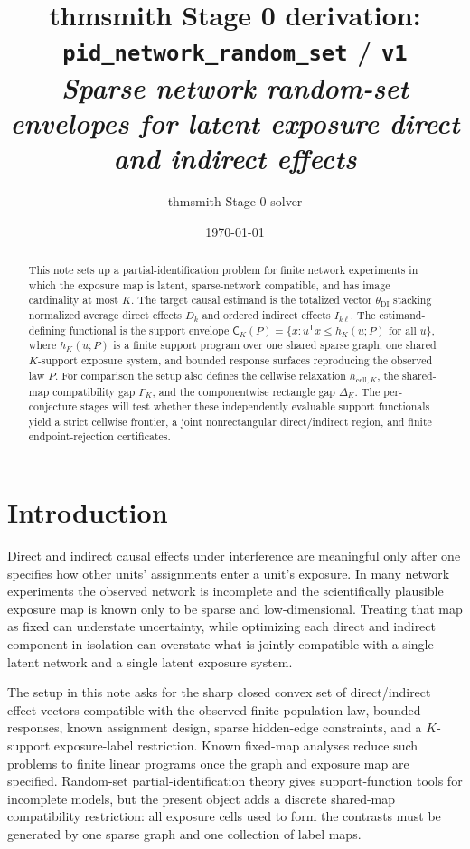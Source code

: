 \documentclass[11pt]{article}
\title{thmsmith Stage 0 derivation: \texttt{pid\_network\_random\_set} / \texttt{v1}%
  \\ \large\textit{Sparse network random-set envelopes for latent exposure direct and indirect effects}}
\author{thmsmith Stage 0 solver}
\date{\today}
\newcommand{\transpose}{\mathsf{T}}
\theoremstyle{definition}
\theoremstyle{plain}
\theoremstyle{remark}
\begin{document}
\maketitle


\begin{abstract}
This note sets up a partial-identification problem for finite network experiments in which the exposure map is latent, sparse-network compatible, and has image cardinality at most \(K\).  The target causal estimand is the totalized vector \(\theta_{\mathrm{DI}}\) stacking normalized average direct effects \(D_k\) and ordered indirect effects \(I_{k\ell}\).  The estimand-defining functional is the support envelope \(\mathsf C_K(P)=\{x:u^\transpose x\le h_K(u;P)\text{ for all }u\}\), where \(h_K(u;P)\) is a finite support program over one shared sparse graph, one shared \(K\)-support exposure system, and bounded response surfaces reproducing the observed law \(P\).  For comparison the setup also defines the cellwise relaxation \(h_{\mathrm{cell},K}\), the shared-map compatibility gap \(\Gamma_K\), and the componentwise rectangle gap \(\Delta_K\).  The per-conjecture stages will test whether these independently evaluable support functionals yield a strict cellwise frontier, a joint nonrectangular direct/indirect region, and finite endpoint-rejection certificates.
\end{abstract}

\section{Introduction}
Direct and indirect causal effects under interference are meaningful only after one specifies how other units' assignments enter a unit's exposure.  In many network experiments the observed network is incomplete and the scientifically plausible exposure map is known only to be sparse and low-dimensional.  Treating that map as fixed can understate uncertainty, while optimizing each direct and indirect component in isolation can overstate what is jointly compatible with a single latent network and a single latent exposure system.

The setup in this note asks for the sharp closed convex set of direct/indirect effect vectors compatible with the observed finite-population law, bounded responses, known assignment design, sparse hidden-edge constraints, and a \(K\)-support exposure-label restriction.  Known fixed-map analyses reduce such problems to finite linear programs once the graph and exposure map are specified.  Random-set partial-identification theory gives support-function tools for incomplete models, but the present object adds a discrete shared-map compatibility restriction: all exposure cells used to form the contrasts must be generated by one sparse graph and one collection of label maps.
\end{document}
